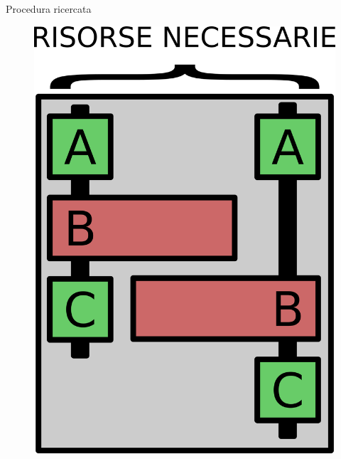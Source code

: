 \documentclass{beamer}
\begin{document}
\begin{frame}
\begin{columns}
\begin{column}{0.8\linewidth}
\begin{block}{Procedura ricercata}
\begin{figure}[H]
\centering
\includegraphics[scale=0.3]{concurrency2.png}
\end{figure}
\end{block}
\end{column}
\end{columns}
\end{frame}
\end{document}
